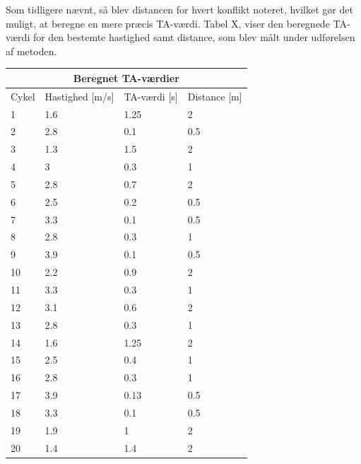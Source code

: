 Som tidligere nævnt, så blev distancen for hvert konflikt noteret, hvilket gør det muligt, at beregne en mere præcis TA-værdi. Tabel X, viser den beregnede TA-værdi for den bestemte hastighed samt distance, som blev målt under udførelsen af metoden.
\begin{tabular}{ |p{1cm}|p{4cm}|p{4cm}|p{4cm}|  }
\hline
\multicolumn{4}{|c|}{Beregnet TA-værdier} \\
\hline
Cykel & Hastighed [m/s] & TA-værdi [s] & Distance [m] \\
\hline
1 & 1.6   & 1.25 & 2 \\
2 & 2.8 & 0.1 & 0.5 \\
3 & 1.3 & 1.5 & 2 \\
4 & 3  & 0.3 & 1 \\
5 & 2.8  & 0.7 & 2 \\
6 & 2.5   & 0.2 & 0.5 \\
7 & 3.3  & 0.1 & 0.5 \\
8 & 2.8  & 0.3 & 1 \\
9 & 3.9  & 0.1 & 0.5 \\
10 & 2.2  & 0.9   & 2 \\
11 & 3.3 & 0.3 &  1 \\
12 & 3.1 & 0.6 &   2\\
13 & 2.8 & 0.3 & 1\\
14 & 1.6  & 1.25   & 2\\
15 & 2.5  & 0.4 & 1\\
16 & 2.8 & 0.3 & 1\\
17 & 3.9 & 0.13 &0.5\\
18 & 3.3 & 0.1 & 0.5\\
19 & 1.9  & 1 & 2\\
20 & 1.4  & 1.4 & 2\\
\hline
\end{tabular}


